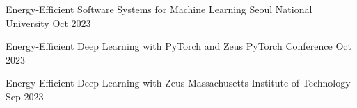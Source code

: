 

\begin{cvtalks}

  \cvtalk
    {Energy-Efficient Software Systems for Machine Learning} %
    {Seoul National University} %
    {Oct 2023} %

  \cvtalk
    {Energy-Efficient Deep Learning with PyTorch and Zeus} %
    {PyTorch Conference} %
    {Oct 2023} %

  \cvtalk
    {Energy-Efficient Deep Learning with Zeus} %
    {Massachusetts Institute of Technology} %
    {Sep 2023} %

\end{cvtalks}
